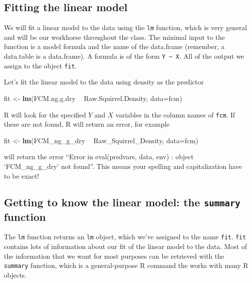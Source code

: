 \documentclass[]{book}
\newenvironment{Shaded}{\begin{snugshade}}{\end{snugshade}}
\newcommand{\KeywordTok}[1]{\textcolor[rgb]{0.13,0.29,0.53}{\textbf{#1}}}
\newcommand{\DataTypeTok}[1]{\textcolor[rgb]{0.13,0.29,0.53}{#1}}
\newcommand{\StringTok}[1]{\textcolor[rgb]{0.31,0.60,0.02}{#1}}
\newcommand{\OperatorTok}[1]{\textcolor[rgb]{0.81,0.36,0.00}{\textbf{#1}}}
\newcommand{\NormalTok}[1]{#1}
\begin{document}
\subsection{Fitting the linear model}\label{fitting-the-linear-model}

We will fit a linear model to the data using the \texttt{lm} function,
which is very general and will be our workhorse throughout the class.
The minimal input to the function is a model formula and the name of the
data.frame (remember, a data.table is a data.frame). A formula is of the
form \texttt{Y\ \textasciitilde{}\ X}. All of the output we assign to
the object \texttt{fit}.

Let's fit the linear model to the data using density as the predictor

\begin{Shaded}
\begin{Highlighting}[]
\NormalTok{  fit <-}\StringTok{ }\KeywordTok{lm}\NormalTok{(FCM.ng.g.dry }\OperatorTok{~}\StringTok{ }\NormalTok{Raw.Squirrel.Density, }\DataTypeTok{data=}\NormalTok{fcm)}
\end{Highlighting}
\end{Shaded}

R will look for the specified \(Y\) and \(X\) variables in the column
names of \texttt{fcm}. If these are not found, R will return an error,
for example

\begin{Shaded}
\begin{Highlighting}[]
\NormalTok{  fit <-}\StringTok{ }\KeywordTok{lm}\NormalTok{(FCM_ng_g_dry }\OperatorTok{~}\StringTok{ }\NormalTok{Raw_Squirrel_Density, }\DataTypeTok{data=}\NormalTok{fcm)}
\end{Highlighting}
\end{Shaded}

will return the error ``Error in eval(predvars, data, env) : object
`FCM\_ng\_g\_dry' not found''. This means your spelling and
capitalization have to be exact!

\subsection{\texorpdfstring{Getting to know the linear model: the
\texttt{summary}
function}{Getting to know the linear model: the summary function}}\label{getting-to-know-the-linear-model-the-summary-function}

The \texttt{lm} function returns an \texttt{lm} object, which we've
assigned to the name \texttt{fit}. \texttt{fit} contains lots of
information about our fit of the linear model to the data. Most of the
information that we want for most purposes can be retrieved with the
\texttt{summary} function, which is a general-purpose R command the
works with many R objects.
\end{document}

